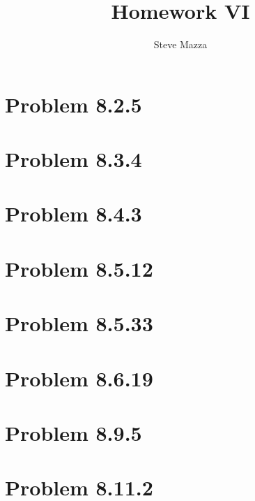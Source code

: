 \documentclass[letterpaper,10pt]{article}
\title{Homework VI}
\author{Steve Mazza}
\begin{document}
\maketitle

\section*{Problem 8.2.5}

\section*{Problem 8.3.4}

\section*{Problem 8.4.3}

\section*{Problem 8.5.12}

\section*{Problem 8.5.33}

\section*{Problem 8.6.19}

\section*{Problem 8.9.5}

\section*{Problem 8.11.2}
\end{document}
